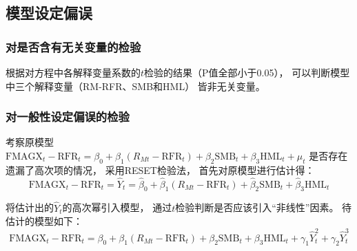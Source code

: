 \documentclass[UTF8]{ctexart}
\begin{document}
\subsection{模型设定偏误}


\subsubsection{对是否含有无关变量的检验}


根据对方程中各解释变量系数的$t$检验的结果（P值全部小于0.05），
可以判断模型中三个解释变量（RM-RFR、SMB和HML）
皆非无关变量。


\subsubsection{对一般性设定偏误的检验}

考察原模型$\text{FMAGX}_t-\mathrm{RFR}_t=\beta_0+\beta_1\left( R_{Mt}-\mathrm{RFR}_t \right)+ \beta_2\mathrm{SMB}_t+\beta_3\mathrm{HML}_t + \mu_t$
是否存在遗漏了高次项的情况，
采用RESET检验法，
首先对原模型进行估计得：
\begin{equation}
  \text{FMAGX}_t-\mathrm{RFR}_t=\hat{Y}_t=\hat\beta_0+\hat\beta_1\left( R_{Mt}-\mathrm{RFR}_t \right)+ \hat\beta_2\mathrm{SMB}_t+\hat\beta_3\mathrm{HML}_t
\end{equation}

将估计出的$\hat{Y}_t$的高次幂引入模型，
通过$t$检验判断是否应该引入“非线性”因素。
待估计的模型如下：
\begin{equation}
  \text{FMAGX}_t-\mathrm{RFR}_t=\beta_0+\beta_1\left( R_{Mt}-\mathrm{RFR}_t \right)+ \beta_2\mathrm{SMB}_t+\beta_3\mathrm{HML}_t+\gamma_1\hat{Y}_t^2+\gamma_2\hat{Y}_t^3
\end{equation}
\end{document}
